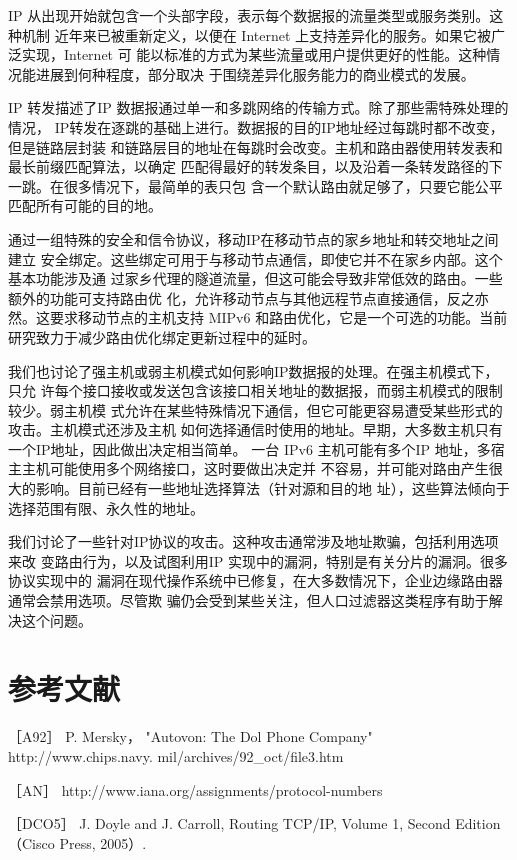 IP 从出现开始就包含一个头部字段，表示每个数据报的流量类型或服务类别。这种机制
近年来已被重新定义，以便在 Internet 上支持差异化的服务。如果它被广泛实现，Internet 可
能以标准的方式为某些流量或用户提供更好的性能。这种情况能进展到何种程度，部分取决
于围绕差异化服务能力的商业模式的发展。

IP 转发描述了IP 数据报通过单一和多跳网络的传输方式。除了那些需特殊处理的情况，
IP转发在逐跳的基础上进行。数据报的目的IP地址经过每跳时都不改变，但是链路层封装
和链路层目的地址在每跳时会改变。主机和路由器使用转发表和最长前缀匹配算法，以确定
匹配得最好的转发条目，以及沿着一条转发路径的下一跳。在很多情况下，最简单的表只包
含一个默认路由就足够了，只要它能公平匹配所有可能的目的地。

通过一组特殊的安全和信令协议，移动IP在移动节点的家乡地址和转交地址之间建立
安全绑定。这些绑定可用于与移动节点通信，即使它并不在家乡内部。这个基本功能涉及通
过家乡代理的隧道流量，但这可能会导致非常低效的路由。一些额外的功能可支持路由优
化，允许移动节点与其他远程节点直接通信，反之亦然。这要求移动节点的主机支持 MIPv6
和路由优化，它是一个可选的功能。当前研究致力于减少路由优化绑定更新过程中的延时。

我们也讨论了强主机或弱主机模式如何影响IP数据报的处理。在强主机模式下，只允
许每个接口接收或发送包含该接口相关地址的数据报，而弱主机模式的限制较少。弱主机模
式允许在某些特殊情况下通信，但它可能更容易遭受某些形式的攻击。主机模式还涉及主机
如何选择通信时使用的地址。早期，大多数主机只有一个IP地址，因此做出决定相当简单。
一台 IPv6 主机可能有多个IP 地址，多宿主主机可能使用多个网络接口，这时要做出决定并
不容易，并可能对路由产生很大的影响。目前已经有一些地址选择算法（针对源和目的地
址），这些算法倾向于选择范围有限、永久性的地址。

我们讨论了一些针对IP协议的攻击。这种攻击通常涉及地址欺骗，包括利用选项来改
变路由行为，以及试图利用IP 实现中的漏洞，特别是有关分片的漏洞。很多协议实现中的
漏洞在现代操作系统中已修复，在大多数情况下，企业边缘路由器通常会禁用选项。尽管欺
骗仍会受到某些关注，但人口过滤器这类程序有助于解决这个问题。

\section{参考文献}

［A92］ P. Mersky， "Autovon: The Dol Phone Company" http://www.chips.navy.
mil/archives/92\_oct/file3.htm

［AN］ http://www.iana.org/assignments/protocol-numbers

［DCO5］ J. Doyle and J. Carroll, Routing TCP/IP, Volume 1, Second Edition （Cisco
Press, 2005）.

